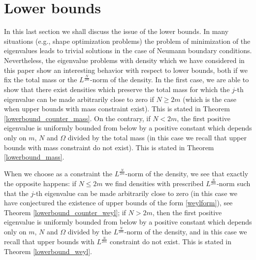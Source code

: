 \documentclass[11pt,a4paper]{amsart}
\numberwithin{equation}{section}
\begin{document}
\section{Lower bounds}\label{sec:lower}




In this last section we shall discuss the issue of the lower bounds. In many situations (e.g., shape optimization problems) the problem of minimization of the eigenvalues leads to trivial solutions in the case of Neumann boundary conditions. Nevertheless, the eigenvalue problems with density which we have considered in this paper show an interesting behavior with respect to lower bounds, both if we fix the total mass or the $L^{\frac{N}{2m}}$-norm of the density. In the first case, we are able to show that there exist densities which preserve the total mass for which the $j$-th eigenvalue can be made arbitrarily close to zero if $N\geq 2m$ (which is the case when upper bounds with mass constraint exist). This is stated in Theorem \ref{lowerbound_counter_mass}. On the contrary, if $N<2m$, the first positive eigenvalue is uniformly bounded from below by a positive constant which depends only on $m$, $N$ and $\Omega$ divided by the total mass (in this case we recall that upper bounds with mass constraint do not exist). This is stated in Theorem \ref{lowerbound_mass}.

When we choose as a constraint the $L^{\frac{N}{2m}}$-norm of the density, we see that exactly the opposite happens: if $N\leq 2m$ we find densities with prescribed $L^{\frac{N}{2m}}$-norm such that the $j$-th eigenvalue can be made arbitrarily close to zero (in this case we have conjectured the existence of upper bounds of the form \eqref{weylform}), see Theorem \ref{lowerbound_counter_weyl}; if $N>2m$, then the first positive eigenvalue is uniformly bounded from below by a positive constant which depends only on $m$, $N$ and $\Omega$ divided by the $L^{\frac{N}{2m}}$-norm of the density, and in this case we recall that upper bounds with $L^{\frac{N}{2m}}$ constraint do not exist. This is stated in Theorem \ref{lowerbound_weyl}.
\end{document}
